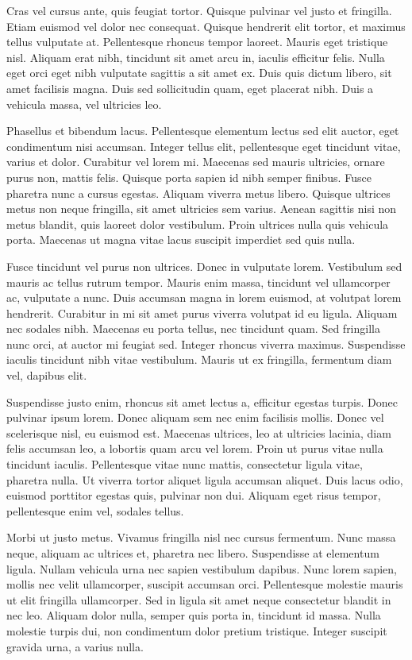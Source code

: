 Cras vel cursus ante, quis feugiat tortor. Quisque pulvinar vel justo et fringilla. Etiam euismod vel dolor nec consequat. Quisque hendrerit elit tortor, et maximus tellus vulputate at. Pellentesque rhoncus tempor laoreet. Mauris eget tristique nisl. Aliquam erat nibh, tincidunt sit amet arcu in, iaculis efficitur felis. Nulla eget orci eget nibh vulputate sagittis a sit amet ex. Duis quis dictum libero, sit amet facilisis magna. Duis sed sollicitudin quam, eget placerat nibh. Duis a vehicula massa, vel ultricies leo.

Phasellus et bibendum lacus. Pellentesque elementum lectus sed elit auctor, eget condimentum nisi accumsan. Integer tellus elit, pellentesque eget tincidunt vitae, varius et dolor. Curabitur vel lorem mi. Maecenas sed mauris ultricies, ornare purus non, mattis felis. Quisque porta sapien id nibh semper finibus. Fusce pharetra nunc a cursus egestas. Aliquam viverra metus libero. Quisque ultrices metus non neque fringilla, sit amet ultricies sem varius. Aenean sagittis nisi non metus blandit, quis laoreet dolor vestibulum. Proin ultrices nulla quis vehicula porta. Maecenas ut magna vitae lacus suscipit imperdiet sed quis nulla.

Fusce tincidunt vel purus non ultrices. Donec in vulputate lorem. Vestibulum sed mauris ac tellus rutrum tempor. Mauris enim massa, tincidunt vel ullamcorper ac, vulputate a nunc. Duis accumsan magna in lorem euismod, at volutpat lorem hendrerit. Curabitur in mi sit amet purus viverra volutpat id eu ligula. Aliquam nec sodales nibh. Maecenas eu porta tellus, nec tincidunt quam. Sed fringilla nunc orci, at auctor mi feugiat sed. Integer rhoncus viverra maximus. Suspendisse iaculis tincidunt nibh vitae vestibulum. Mauris ut ex fringilla, fermentum diam vel, dapibus elit.

Suspendisse justo enim, rhoncus sit amet lectus a, efficitur egestas turpis. Donec pulvinar ipsum lorem. Donec aliquam sem nec enim facilisis mollis. Donec vel scelerisque nisl, eu euismod est. Maecenas ultrices, leo at ultricies lacinia, diam felis accumsan leo, a lobortis quam arcu vel lorem. Proin ut purus vitae nulla tincidunt iaculis. Pellentesque vitae nunc mattis, consectetur ligula vitae, pharetra nulla. Ut viverra tortor aliquet ligula accumsan aliquet. Duis lacus odio, euismod porttitor egestas quis, pulvinar non dui. Aliquam eget risus tempor, pellentesque enim vel, sodales tellus.

Morbi ut justo metus. Vivamus fringilla nisl nec cursus fermentum. Nunc massa neque, aliquam ac ultrices et, pharetra nec libero. Suspendisse at elementum ligula. Nullam vehicula urna nec sapien vestibulum dapibus. Nunc lorem sapien, mollis nec velit ullamcorper, suscipit accumsan orci. Pellentesque molestie mauris ut elit fringilla ullamcorper. Sed in ligula sit amet neque consectetur blandit in nec leo. Aliquam dolor nulla, semper quis porta in, tincidunt id massa. Nulla molestie turpis dui, non condimentum dolor pretium tristique. Integer suscipit gravida urna, a varius nulla.

